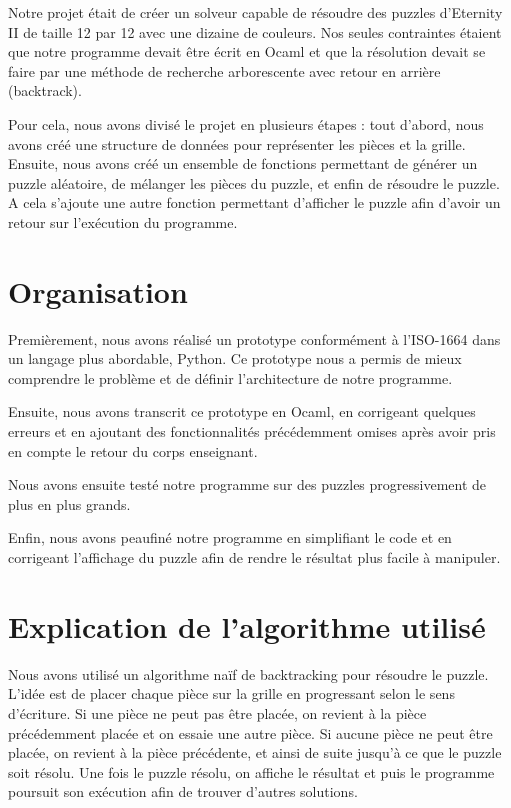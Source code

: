 \documentclass[12pt, openany]{report}
\begin{document}
Notre projet était de créer un solveur capable de résoudre des
puzzles d’Eternity II de taille 12 par 12 avec une dizaine de
couleurs. Nos seules contraintes étaient que notre programme devait
être écrit en Ocaml et que la résolution devait se faire par une
méthode de recherche arborescente avec retour en arrière (backtrack).

Pour cela, nous avons divisé le projet en plusieurs étapes :
tout d’abord, nous avons créé une structure de données pour
représenter les pièces et la grille. Ensuite, nous avons créé un
ensemble de fonctions permettant de générer un puzzle aléatoire,
de mélanger les pièces du puzzle, et enfin de résoudre le puzzle.
A cela s’ajoute une autre fonction permettant d'afficher le puzzle
afin d'avoir un retour sur l'exécution du programme.

\section*{Organisation}

Premièrement, nous avons réalisé un prototype conformément à
l'ISO-1664 dans un langage plus abordable, Python. Ce prototype
nous a permis de mieux comprendre le problème et de définir
l'architecture de notre programme.

Ensuite, nous avons transcrit ce prototype en Ocaml, en corrigeant
quelques erreurs et en ajoutant des fonctionnalités précédemment
omises après avoir pris en compte le retour du corps enseignant.

Nous avons ensuite testé notre programme sur des puzzles
progressivement de plus en plus grands.

Enfin, nous avons peaufiné notre programme en simplifiant le code
et en corrigeant l'affichage du puzzle afin de rendre le résultat
plus facile à manipuler.

\section*{Explication de l'algorithme utilisé}

Nous avons utilisé un algorithme naïf de backtracking pour résoudre
le puzzle. L’idée est de placer chaque pièce sur la grille en
progressant selon le sens d’écriture. Si une pièce ne peut pas être
placée, on revient à la pièce précédemment placée et on essaie une
autre pièce. Si aucune pièce ne peut être placée, on revient à la
pièce précédente, et ainsi de suite jusqu’à ce que le puzzle soit
résolu. Une fois le puzzle résolu, on affiche le résultat et puis
le programme poursuit son exécution afin de trouver d'autres
solutions. 
\end{document}
